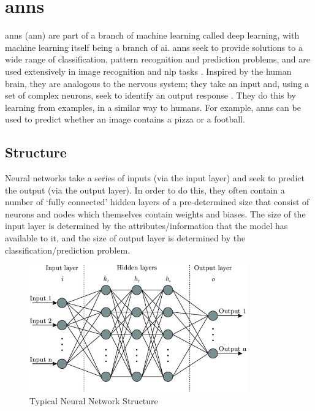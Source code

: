 
\section{\acrlong{ann}s}
\label{sec:background_anns}

\acrlong{ann}s (\acrshort{ann}) are part of a branch of machine learning called deep learning, with machine learning itself being a branch of \acrlong{ai}. \acrshort{ann}s seek to provide solutions to a wide range of classification, pattern recognition and prediction problems, and are used extensively in image recognition and \acrfull{nlp} tasks \citep{Abiodun}. Inspired by the human brain, they are analogous to the nervous system; they take an input and, using a set of complex neurons, seek to identify an output response \citep{Bishop}. They do this by learning from examples, in a similar way to humans. For example, \acrshort{ann}s can be used to predict whether an image contains a pizza or a football.

\subsection{Structure}
\label{sec:background_anns_structure}

Neural networks take a series of inputs (via the input layer) and seek to predict the output (via the output layer). In order to do this, they often contain a number of `fully connected' hidden layers of a pre-determined size that consist of neurons and nodes which themselves contain weights and biases. The size of the input layer is determined by the attributes/information that the model has available to it, and the size of output layer is determined by the classification/prediction problem. 

\begin{figure}[h]
    \centering
    \includegraphics[height=5.5cm] {paper/images/neural_network_structure.jpeg} %
    \caption{Typical Neural Network Structure \citep{Shukla}}
    \label{fig:neural_network_structure}
\end{figure}

